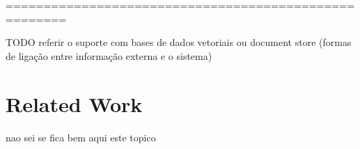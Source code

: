 ======================================================



TODO referir o suporte com bases de dados vetoriais ou document store (formas de ligação entre informação externa e o sistema)







\section{Related Work}

nao sei se fica bem aqui este topico



